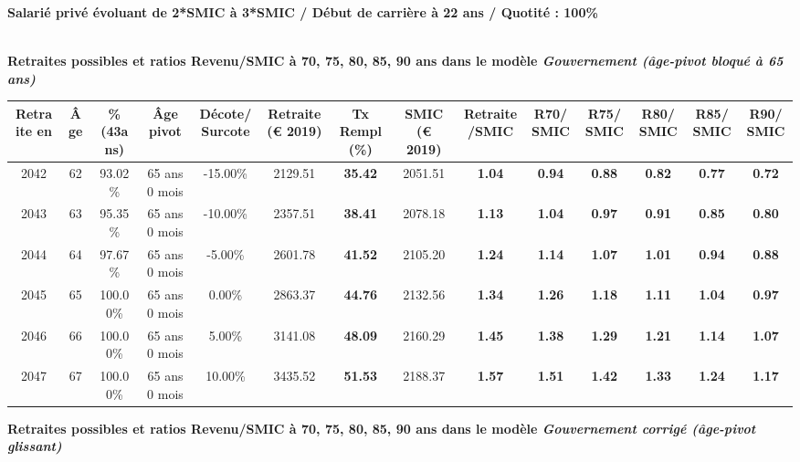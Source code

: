 {\bf \noindent Salarié privé évoluant de 2*SMIC à 3*SMIC / Début de carrière à 22 ans / Quotité : 100\%}  ~ 

 ~\\{\bf \noindent Retraites possibles et ratios Revenu/SMIC à 70, 75, 80, 85, 90 ans dans le modèle \emph{Gouvernement (âge-pivot bloqué à 65 ans)}}  
 
\begin{adjustbox}{max width=\textwidth} 
\begin{tabular}[htb]{|c|c||c|c|c||c|c||c|c||c|c|c|c|c|} 
\hline 
 Retraite en &  Âge &  \%(43ans) &  Âge pivot &  Décote/Surcote &  Retraite (\euro{} 2019) &  Tx Rempl(\%) &  SMIC (\euro{} 2019) &  Retraite/SMIC &  R70/SMIC &  R75/SMIC &  R80/SMIC &  R85/SMIC &  R90/SMIC \\ 
\hline \hline 
 2042 &  62 &  93.02\% &  65 ans 0 mois &  -15.00\% &  2129.51 &  {\bf 35.42} &  2051.51 &  {\bf 1.04} &  {\bf {\color{red} 0.94}} &  {\bf {\color{red} 0.88}} &  {\bf {\color{red} 0.82}} &  {\bf {\color{red} 0.77}} &  {\bf {\color{red} 0.72}} \\ 
\hline 
 2043 &  63 &  95.35\% &  65 ans 0 mois &  -10.00\% &  2357.51 &  {\bf 38.41} &  2078.18 &  {\bf 1.13} &  {\bf 1.04} &  {\bf {\color{red} 0.97}} &  {\bf {\color{red} 0.91}} &  {\bf {\color{red} 0.85}} &  {\bf {\color{red} 0.80}} \\ 
\hline 
 2044 &  64 &  97.67\% &  65 ans 0 mois &  -5.00\% &  2601.78 &  {\bf 41.52} &  2105.20 &  {\bf 1.24} &  {\bf 1.14} &  {\bf 1.07} &  {\bf 1.01} &  {\bf {\color{red} 0.94}} &  {\bf {\color{red} 0.88}} \\ 
\hline 
 2045 &  65 &  100.00\% &  65 ans 0 mois &  0.00\% &  2863.37 &  {\bf 44.76} &  2132.56 &  {\bf 1.34} &  {\bf 1.26} &  {\bf 1.18} &  {\bf 1.11} &  {\bf 1.04} &  {\bf {\color{red} 0.97}} \\ 
\hline 
 2046 &  66 &  100.00\% &  65 ans 0 mois &  5.00\% &  3141.08 &  {\bf 48.09} &  2160.29 &  {\bf 1.45} &  {\bf 1.38} &  {\bf 1.29} &  {\bf 1.21} &  {\bf 1.14} &  {\bf 1.07} \\ 
\hline 
 2047 &  67 &  100.00\% &  65 ans 0 mois &  10.00\% &  3435.52 &  {\bf 51.53} &  2188.37 &  {\bf 1.57} &  {\bf 1.51} &  {\bf 1.42} &  {\bf 1.33} &  {\bf 1.24} &  {\bf 1.17} \\ 
\hline 
\hline 
\end{tabular} 
\end{adjustbox} 
 
 \vspace{0.1cm} 
{\bf \noindent Retraites possibles et ratios Revenu/SMIC à 70, 75, 80, 85, 90 ans dans le modèle \emph{Gouvernement corrigé (âge-pivot glissant)}}  
 
